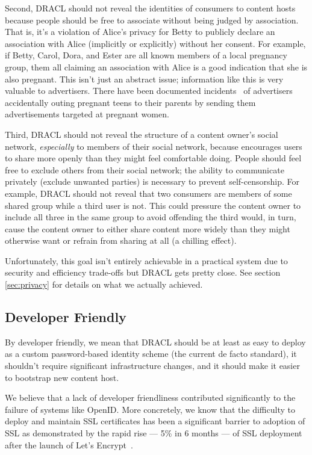 \documentclass[pdftex,12pt,a4papaer]{report}
\begin{document}
Second, DRACL should not reveal the identities of consumers to content hosts
because people should be free to associate without being judged by association.
That is, it's a violation of Alice's privacy for Betty to publicly declare an
association with Alice (implicitly or explicitly) without her consent. For
example, if Betty, Carol, Dora, and Ester are all known members of a local
pregnancy group, them all claiming an association with Alice is a good
indication that she is also pregnant. This isn't just an abstract issue;
information like this is very valuable to advertisers. There have been
documented incidents~\cite{target} of advertisers accidentally outing pregnant
teens to their parents by sending them advertisements targeted at pregnant
women.

Third, DRACL should not reveal the structure of a content owner's social network,
\emph{especially} to members of their social network, because encourages users
to share more openly than they might feel comfortable doing. People should feel free to exclude others from their
social network; the ability to communicate privately (exclude unwanted parties)
is necessary to prevent self-censorship. For example, DRACL should not reveal
that two consumers are members of some shared group while a third user is not.
This could pressure the content owner to include all three in the same group to
avoid offending the third would, in turn, cause the content owner to either
share content more widely than they might otherwise want or refrain from sharing
at all (a chilling effect).

Unfortunately, this goal isn't entirely achievable in a practical system due to
security and efficiency trade-offs but DRACL gets pretty close. See section
\ref{sec:privacy} for details on what we actually achieved.

\subsection{Developer Friendly}
\label{sub:goal-developer}

By developer friendly, we mean that DRACL should be at least as easy to deploy
as a custom password-based identity scheme (the current de facto standard), it 
shouldn't require significant infrastructure changes, and it should make it
easier to bootstrap new content host.

We believe that a lack of developer friendliness contributed significantly to
the failure of systems like OpenID\cite{openid}. More concretely, we know that
the difficulty to deploy and maintain SSL certificates has been a significant
barrier to adoption of SSL as demonstrated by the rapid rise --- 5\% in 6 months
--- of SSL deployment after the launch of Let's Encrypt~\cite{lets-encrypt}.
\end{document}
